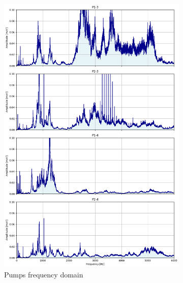 \begin{figure}[h]
\begin{subfigure}[b]{0.33\textwidth}
        \includegraphics[width=\textwidth]{assets/results/eda/frequency-spectrum-pumps.png}
        \caption{Pumps frequency domain}
    \end{subfigure}
    \hfill
    \begin{subfigure}[b]{0.33\textwidth}

\end{subfigure}
\end{figure}
